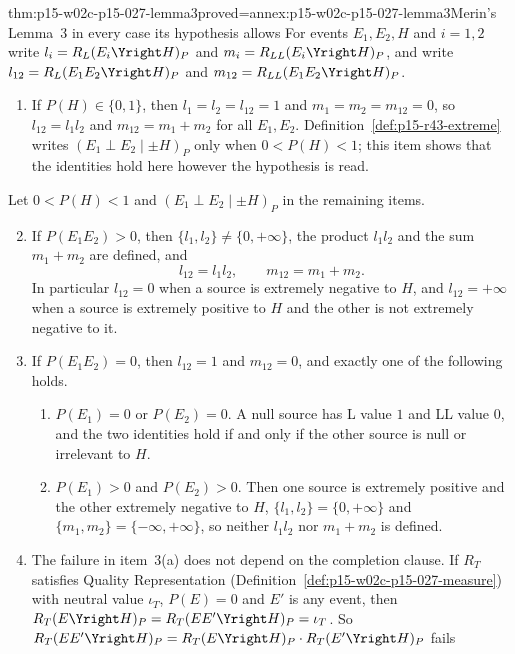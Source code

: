 \begin{hbtheorem}{thm:p15-w02c-p15-027-lemma3}{proved=annex:p15-w02c-p15-027-lemma3}{Merin's Lemma~3 in every case its hypothesis allows}
For events \(E_1,E_2,H\) and \(i=1,2\) write
\(l_i=R_L(E_i\Yright H)_P\) and \(m_i=R_{LL}(E_i\Yright H)_P\), and write
\(l_{12}=R_L(E_1E_2\Yright H)_P\) and \(m_{12}=R_{LL}(E_1E_2\Yright H)_P\).
\begin{enumerate}
\item If \(P(H)\in\{0,1\}\), then \(l_1=l_2=l_{12}=1\) and
  \(m_1=m_2=m_{12}=0\), so \(l_{12}=l_1l_2\) and \(m_{12}=m_1+m_2\) for
  all \(E_1,E_2\). Definition~\ref{def:p15-r43-extreme} writes
  \((E_1\perp E_2\mid\pm H)_P\) only when \(0<P(H)<1\); this item shows
  that the identities hold here however the hypothesis is read.
\end{enumerate}
Let \(0<P(H)<1\) and \((E_1\perp E_2\mid\pm H)_P\) in the remaining items.
\begin{enumerate}
\setcounter{enumi}{1}
\item If \(P(E_1E_2)>0\), then \(\{l_1,l_2\}\neq\{0,+\infty\}\), the
  product \(l_1l_2\) and the sum \(m_1+m_2\) are defined, and
  \[
   l_{12}=l_1l_2,\qquad m_{12}=m_1+m_2 .
  \]
  In particular \(l_{12}=0\) when a source is extremely negative to
  \(H\), and \(l_{12}=+\infty\) when a source is extremely positive to
  \(H\) and the other is not extremely negative to it.
\item If \(P(E_1E_2)=0\), then \(l_{12}=1\) and \(m_{12}=0\), and exactly
  one of the following holds.
  \begin{enumerate}
  \item \(P(E_1)=0\) or \(P(E_2)=0\). A null source has L value \(1\)
    and LL value \(0\), and the two identities hold if and only if the
    other source is null or irrelevant to \(H\).
  \item \(P(E_1)>0\) and \(P(E_2)>0\). Then one source is extremely
    positive and the other extremely negative to \(H\),
    \(\{l_1,l_2\}=\{0,+\infty\}\) and \(\{m_1,m_2\}=\{-\infty,+\infty\}\),
    so neither \(l_1l_2\) nor \(m_1+m_2\) is defined.
  \end{enumerate}
\item The failure in item~3(a) does not depend on the completion clause.
  If \(R_T\) satisfies Quality Representation
  (Definition~\ref{def:p15-w02c-p15-027-measure}) with neutral value
  \(\iota_T\), \(P(E)=0\) and \(E'\) is any event, then
  \(R_T(E\Yright H)_P=R_T(EE'\Yright H)_P=\iota_T\). So
  \(R_T(EE'\Yright H)_P=R_T(E\Yright H)_P\cdot R_T(E'\Yright H)_P\) fails

\end{enumerate}
\end{hbtheorem}

